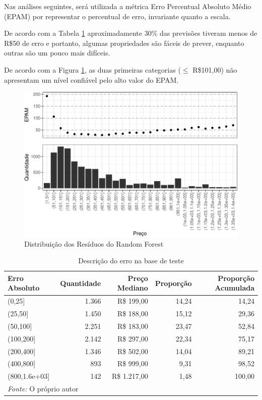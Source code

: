 \documentclass[
	12pt,				%
	a4paper,		%
	oneside,    %
	chapter=TITLE,		   %
	section=TITLE,		   %
	subsection=TITLE,	   %
	subsubsection=TITLE, %
	english,			%
	french,				%
	spanish,			%
	brazil,				%
]{abntex2}
\begin{document}
Nas análises seguintes, será utilizada a métrica Erro Percentual
Absoluto Médio (EPAM) por representar o percentual de erro, invariante
quanto a escala.

De acordo com a Tabela \ref{tab:erro_test} aproximadamente 30\% das
previsões tiveram menos de R\$50 de erro e portanto, algumas
propriedades são fáceis de prever, enquanto outras são um pouco mais
difíceis.

De acordo com a Figura \ref{graf_resid_rf}, as duas primeiras categorias
(\(\le\) R\$101,00) não apresentam um nível confiável pelo alto valor do
EPAM.

\begin{figure}
\centering
\includegraphics{00-TCC_files/figure-latex/graf_resid_rf-1.pdf}
\caption{\label{graf_resid_rf}Distribuição dos Resíduos do Random
Forest}
\end{figure}

\begin{table}

\caption{\label{tab:erro_test}Descrição do erro na base de teste}
\centering
\begin{tabular}[t]{l|r|r|r|r}
\hline
Erro Absoluto & Quantidade & Preço Mediano & Proporção & Proporção Acumulada\\
\hline
(0,25] & 1.366 & R\$   199,00 & 14,24 & 14,24\\
\hline
(25,50] & 1.450 & R\$   188,00 & 15,12 & 29,36\\
\hline
(50,100] & 2.251 & R\$   183,00 & 23,47 & 52,84\\
\hline
(100,200] & 2.142 & R\$   297,00 & 22,34 & 75,17\\
\hline
(200,400] & 1.346 & R\$   502,00 & 14,04 & 89,21\\
\hline
(400,800] & 893 & R\$   999,00 & 9,31 & 98,52\\
\hline
(800,1.6e+03] & 142 & R\$ 1.217,00 & 1,48 & 100,00\\
\hline
\multicolumn{5}{l}{\textit{Fonte: } O próprio autor}\\
\end{tabular}
\end{table}
\end{document}
